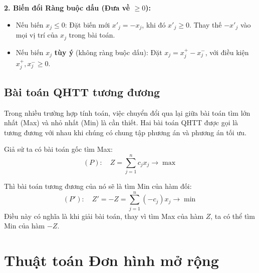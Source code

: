 \textbf{2. Biến đổi Ràng buộc dấu (Đưa về $\ge 0$):}
\begin{itemize}
    \item Nếu biến $x_j \le 0$: Đặt biến mới $x'_j = -x_j$, khi đó $x'_j \ge 0$. Thay thế $-x'_j$ vào mọi vị trí của $x_j$ trong bài toán.
    \item Nếu biến $x_j$ \textbf{tùy ý} (không ràng buộc dấu): Đặt $x_j = x_j^+ - x_j^-$, với điều kiện $x_j^+, x_j^- \ge 0$.
\end{itemize}


\vspace{0.5cm}


\subsection{Bài toán QHTT tương đương}
Trong nhiều trường hợp tính toán, việc chuyển đổi qua lại giữa bài toán tìm lớn nhất (Max) và nhỏ nhất (Min) là cần thiết. Hai bài toán QHTT được gọi là tương đương với nhau khi chúng có chung tập phương án và phương án tối ưu.

Giả sử ta có bài toán gốc tìm Max:
\begin{equation*}
    (P): \quad Z = \sum_{j=1}^{n} c_j x_j \rightarrow \max
\end{equation*}

Thì bài toán tương đương của nó sẽ là tìm Min của hàm đối:
\begin{equation*}
    (P'): \quad Z' = -Z = \sum_{j=1}^{n} (-c_j) x_j \rightarrow \min
\end{equation*}
Điều này có nghĩa là khi giải bài toán, thay vì tìm Max của hàm $Z$, ta có thể tìm Min của hàm $-Z$.

\section{Thuật toán Đơn hình mở rộng}


